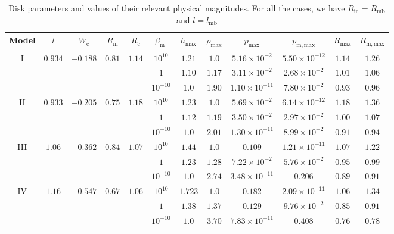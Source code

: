 \documentclass[twocolumn,aps,showpacs,showkeys,prd,superscriptaddress,byrevtex, amsmath]{revtex4-1}
\begin{document}
\begin{table}[t]
\caption{Disk parameters and values of their relevant physical magnitudes. For all the cases, we have $R_{\mathrm{in}} = R_{\mathrm{mb}}$ and $l = l_{\mathrm{mb}}$}        
\label{HBH_disk_parameters}      
\centering          
\begin{tabular}{c c c c c  c c c c c c c}
\hline\hline       
 Model & $l$ & $W_{\mathrm{c}}$ & $R_{\mathrm{in}}$ & $R_{\mathrm{c}}$ &  $\beta_{\mathrm{m_{\mathrm{c}}}}$ & $h_{\mathrm{max}}$ & $\rho_{\mathrm{max}}$ & $p_{\mathrm{max}}$ & $p_{\mathrm{m, max}}$ & $R_{\mathrm{max}}$ & $R_{\mathrm{m, max}}$\\ 
\hline           
I & $0.934$ & $-0.188$ & $0.81$ & $1.14$ & $10^{10}$ & $1.21$ & $1.0$ & $5.16 \times 10^{-2}$ & $5.50 \times 10^{-12}$ & $1.14$ & $1.26$\\ 
 \hline 
 &  &  &  &  & $1$ & $1.10$ & $1.17$ & $3.11 \times 10^{-2}$ & $2.68 \times 10^{-2}$ & $1.01$ & $1.06$\\ 
 \hline 
 &  &  &  &  & $10^{-10}$ & $1.0$ & $1.90$ & $1.10 \times 10^{-11}$ & $7.80 \times 10^{-2}$ & $0.93$ & $0.96$\\ 
 \hline 
II & $0.933$ & $-0.205$ & $0.75$ & $1.18$ & $10^{10}$ & $1.23$ & $1.0$ & $5.69 \times 10^{-2}$ & $6.14 \times 10^{-12}$ & $1.18$ & $1.36$\\ 
 \hline 
 &  &  &  &  & $1$ & $1.12$ & $1.19$ & $3.50 \times 10^{-2}$ & $2.97 \times 10^{-2}$ & $1.00$ & $1.07$\\ 
 \hline 
 &  &  &  &  & $10^{-10}$ & $1.0$ & $2.01$ & $1.30 \times 10^{-11}$ & $8.99 \times 10^{-2}$ & $0.91$ & $0.94$ \\ 
 \hline 
III & $1.06$ & $-0.362$ & $0.84$ & $1.07$ & $10^{10}$ & $1.44$ & $1.0$ & $0.109$ & $1.21 \times 10^{-11}$ & $1.07$ & $1.22$\\ 
 \hline 
 &  &  &  &  & $1$ & $1.23$ & $1.28$ & $7.22 \times 10^{-2}$ & $5.76 \times 10^{-2}$ & $0.95$ & $0.99$ \\ 
 \hline 
 &  &  &  &  & $10^{-10}$ & $1.0$ & $2.74$ & $3.48 \times 10^{-11}$ & $0.206$ & $0.89$ & $0.91$\\ 
\hline  
IV & $1.16$ & $-0.547$ & $0.67$ & $1.06$ & $10^{10}$ & $1.723$ & $1.0$ & $0.182$ & $2.09 \times 10^{-11}$ & $1.06$ & $1.34$ \\ 
\hline 
 &  &  &  &  & $1$ & $1.38$ & $1.37$ & $0.129$ & $9.76 \times 10^{-2}$ & $0.85$ & $0.91$\\ 
\hline 
 &  &  &  &  & $10^{-10}$ & $1.0$ & $3.70$ & $7.83 \times 10^{-11}$ & $0.408$ & $0.76$ & $0.78$ \\ 

\end{tabular}
\end{table}
\end{document}
